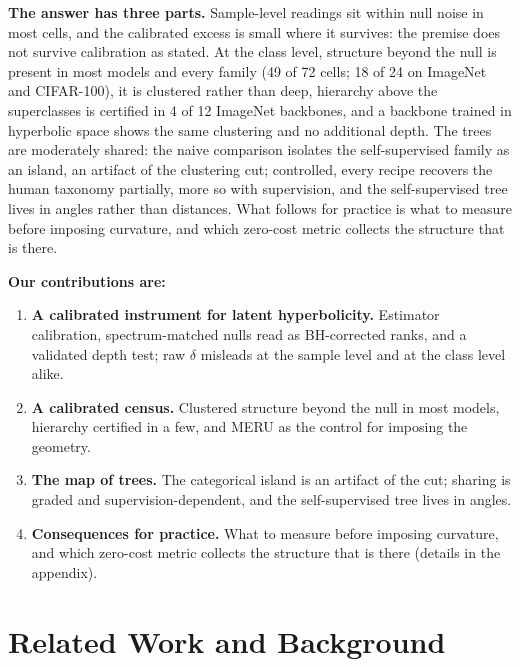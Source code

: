 \documentclass{article}
\begin{document}
\textbf{The answer has three parts.} Sample-level readings sit within null noise in most cells, and the calibrated excess is small where it survives: the premise does not survive calibration as stated. At the class level, structure beyond the null is present in most models and every family (49 of 72 cells; 18 of 24 on ImageNet and CIFAR-100), it is clustered rather than deep, hierarchy above the superclasses is certified in 4 of 12 ImageNet backbones, and a backbone trained in hyperbolic space shows the same clustering and no additional depth. The trees are moderately shared: the naive comparison isolates the self-supervised family as an island, an artifact of the clustering cut; controlled, every recipe recovers the human taxonomy partially, more so with supervision, and the self-supervised tree lives in angles rather than distances. What follows for practice is what to measure before imposing curvature, and which zero-cost metric collects the structure that is there. %

\textbf{Our contributions are:}
\begin{enumerate}[topsep=0pt,itemsep=1pt,leftmargin=*]
\item \textbf{A calibrated instrument for latent hyperbolicity.} Estimator calibration, spectrum-matched nulls read as BH-corrected ranks, and a validated depth test; raw $\delta$ misleads at the sample level and at the class level alike.
\item \textbf{A calibrated census.} Clustered structure beyond the null in most models, hierarchy certified in a few, and MERU as the control for imposing the geometry.
\item \textbf{The map of trees.} The categorical island is an artifact of the cut; sharing is graded and supervision-dependent, and the self-supervised tree lives in angles.
\item \textbf{Consequences for practice.} What to measure before imposing curvature, and which zero-cost metric collects the structure that is there (details in the appendix).
\end{enumerate}


\section{Related Work and Background}
\label{sec:related}
\end{document}
